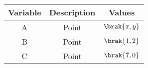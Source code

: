 \begin{tabular}[12pt]{|c|c|c|}
\hline
\textbf{Variable} & \textbf{Description} & \textbf{Values}\\
\hline
A & Point & $\brak{x,y}$\\
\hline
B & Point & $\brak{1,2}$\\
\hline
C & Point & $\brak{7,0}$\\

\hline
\end{tabular}